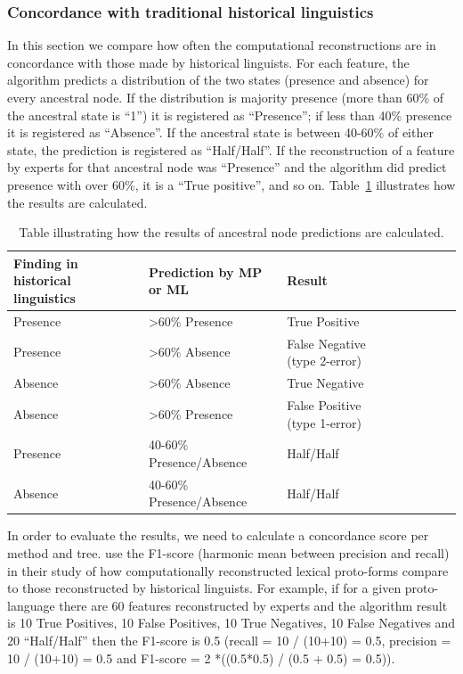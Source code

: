 \documentclass[draft,10pt]{article} %
\begin{document}
\subsubsection{Concordance with traditional historical linguistics}
In this section we compare how often the computational reconstructions are in concordance with those made by historical linguists. For each feature, the algorithm predicts a distribution of the two states (presence and absence) for every ancestral node. If the distribution is majority presence (more than 60\% of the ancestral state is ``1'') it is registered as ``Presence''; if less than 40\% presence it is registered as ``Absence''. If the ancestral state is between 40-60\% of either state, the prediction is registered as ``Half/Half''. If the reconstruction of a feature by experts for that ancestral node was ``Presence'' and the algorithm did predict presence with over 60\%, it is a ``True positive'', and so on. Table~\ref{example_HL_prediction_table_true_positives} illustrates how the results are calculated.

\begin{table}[H]
\centering
\caption{Table illustrating how the results of ancestral node predictions are calculated.}
\label{example_HL_prediction_table_true_positives}
\begin{tabular}{|l|l|l|l|l|l|l|l|}
\hline
\textbf{Finding in historical linguistics} & \textbf{Prediction by MP or ML} & \textbf{Result} \\ \hline
Presence & >60\% Presence & True Positive \\ \hline
Presence & >60\% Absence & False Negative (type 2-error) \\ \hline
Absence & >60\% Absence & True Negative \\ \hline
Absence & >60\% Presence & False Positive (type 1-error) \\ \hline
Presence & 40-60\% Presence/Absence & Half/Half\\ \hline
Absence & 40-60\% Presence/Absence & Half/Half \\ \hline
\end{tabular}
\end{table}

In order to evaluate the results, we need to calculate a concordance score per method and tree. \citet{jager2018using} use the F1-score (harmonic mean between precision and recall) in their study of how computationally reconstructed lexical proto-forms compare to those reconstructed by historical linguists.  For example, if for a given proto-language there are 60 features reconstructed by experts and the algorithm result is 10 True Positives, 10 False Positives, 10 True Negatives, 10 False Negatives and 20 ``Half/Half'' then the F1-score is 0.5 (recall = 10 / (10+10) = 0.5, precision = 10 / (10+10) = 0.5 and F1-score = 2 *((0.5*0.5) / (0.5 + 0.5) = 0.5)). %
\end{document}

